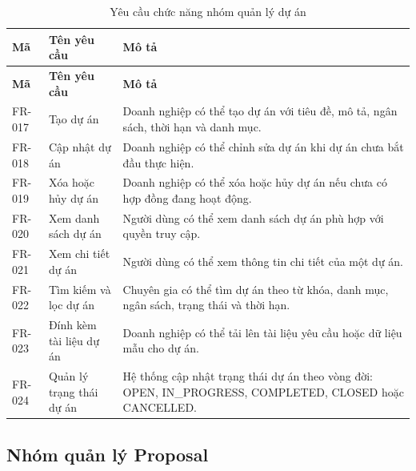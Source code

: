 \begin{longtable}{|p{2.0cm}|p{4.2cm}|p{7.6cm}|}
\caption{Yêu cầu chức năng nhóm quản lý dự án}
\label{tab:fr-project} \\ \hline
\textbf{Mã} & \textbf{Tên yêu cầu} & \textbf{Mô tả} \\ \hline
\endfirsthead
\hline
\textbf{Mã} & \textbf{Tên yêu cầu} & \textbf{Mô tả} \\ \hline
\endhead

FR-017 & Tạo dự án & Doanh nghiệp có thể tạo dự án với tiêu đề, mô tả, ngân sách, thời hạn và danh mục. \\ \hline
FR-018 & Cập nhật dự án & Doanh nghiệp có thể chỉnh sửa dự án khi dự án chưa bắt đầu thực hiện. \\ \hline
FR-019 & Xóa hoặc hủy dự án & Doanh nghiệp có thể xóa hoặc hủy dự án nếu chưa có hợp đồng đang hoạt động. \\ \hline
FR-020 & Xem danh sách dự án & Người dùng có thể xem danh sách dự án phù hợp với quyền truy cập. \\ \hline
FR-021 & Xem chi tiết dự án & Người dùng có thể xem thông tin chi tiết của một dự án. \\ \hline
FR-022 & Tìm kiếm và lọc dự án & Chuyên gia có thể tìm dự án theo từ khóa, danh mục, ngân sách, trạng thái và thời hạn. \\ \hline
FR-023 & Đính kèm tài liệu dự án & Doanh nghiệp có thể tải lên tài liệu yêu cầu hoặc dữ liệu mẫu cho dự án. \\ \hline
FR-024 & Quản lý trạng thái dự án & Hệ thống cập nhật trạng thái dự án theo vòng đời: OPEN, IN\_PROGRESS, COMPLETED, CLOSED hoặc CANCELLED. \\ \hline
\end{longtable}

\subsection{Nhóm quản lý Proposal}


